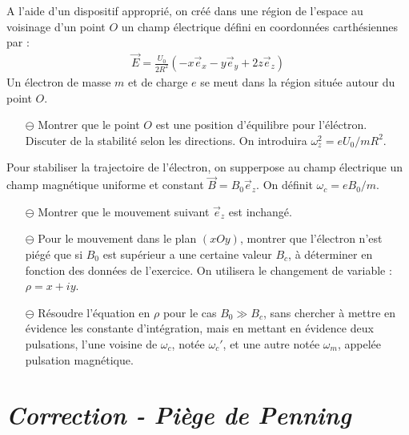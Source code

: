\documentclass{report}
\begin{document}
A l'aide d'un dispositif approprié, on créé dans une région de l'espace au voisinage d'un point $O$ un champ électrique défini en coordonnées carthésiennes par :
\begin{align*}
	\vec{E}=\frac{U_0}{2R^2}\left(-x\vec{e}_x-y\vec{e}_y+2z\vec{e}_z \right) 
\end{align*}
Un électron de masse $m$ et de charge $e$ se meut dans la région située autour du point $O$.
\begin{itemize}

	\item[$\ominus$] Montrer que le point $O$ est une position d'équilibre pour l'éléctron. Discuter de la stabilité selon les directions. On introduira $\omega_z^2=eU_0/mR^2$.
	
\end{itemize}

Pour stabiliser la trajectoire de l'électron, on supperpose au champ électrique un champ magnétique uniforme et constant $\vec{B}=B_0\vec{e}_z$. On définit $\omega_c=eB_0/m$. 

\begin{itemize}

		\item[$\ominus$] Montrer que le mouvement suivant $\vec{e}_z$ est inchangé.
		
		\item[$\ominus$] Pour le mouvement dans le plan $(xOy)$, montrer que l'électron n'est piégé que si $B_0$ est supérieur a une certaine valeur $B_c$, à déterminer en fonction des données de l'exercice. On utilisera le changement de variable : $\rho = x+iy$.
		
		\item[$\ominus$] Résoudre l'équation en $\rho$ pour le cas $B_0\gg B_c$, sans chercher à mettre en évidence les constante d'intégration, mais en mettant en évidence deux pulsations, l'une voisine de $\omega_c$, notée $\omega_c'$, et une autre notée $\omega_m$, appelée pulsation magnétique. 
		
\end{itemize}

\newpage

\section*{\textit{Correction - Piège de Penning}}
\end{document}
